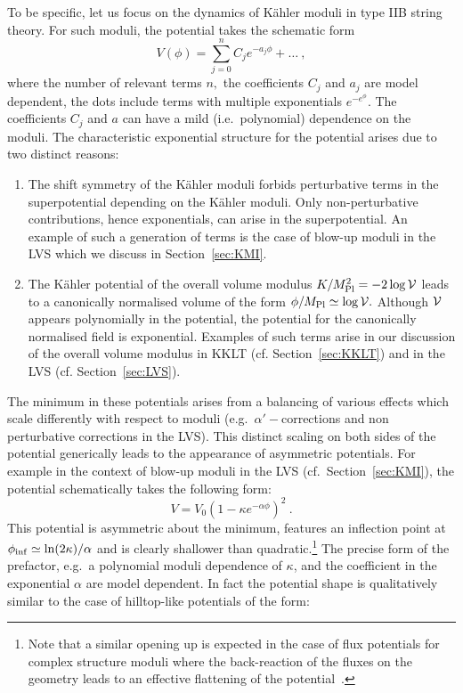 \documentclass[12pt]{article}
\begin{document}
To be specific, let us focus on the dynamics of K\"ahler moduli in type IIB string theory. For such moduli, the potential takes the schematic form
\begin{equation}
V(\phi)=\sum_{j=0}^n C_j e^{-a_j  \phi}+\ldots~,
\end{equation}
where the number of relevant terms $n,$ the coefficients $C_j$ and $a_j$ are model dependent,  the dots include terms with multiple exponentials $e^{-e^\phi}.$ The coefficients $C_j$ and $a$ can have a mild (i.e.~polynomial) dependence on the moduli. The characteristic exponential structure for the potential arises due to two distinct reasons:
\begin{enumerate}
\item The shift symmetry of the K\"ahler moduli forbids perturbative terms in the superpotential depending on the K\"ahler moduli. Only non-perturbative contributions, hence exponentials, can arise in the superpotential. An example of such a generation of terms is the case of blow-up moduli in the LVS which we discuss in Section~\ref{sec:KMI}.
\item The K\"ahler potential of the overall volume modulus $K/M^2_{\rm Pl}=-2\log{{\mathcal V}}$ leads to a canonically normalised volume of the form $\phi/M_{\rm Pl}\simeq \log{{\mathcal V}}.$ Although ${\cal V}$ appears polynomially in the potential, the potential for the canonically normalised field is exponential. Examples of such terms arise in our discussion of the overall volume modulus in KKLT (cf. Section~\ref{sec:KKLT}) and in the LVS (cf. Section~\ref{sec:LVS}).
\end{enumerate}
The minimum in these potentials arises from a balancing of various effects which scale differently with respect to moduli (e.g.~$\alpha'-$corrections and non perturbative corrections in the LVS). This distinct scaling on both sides of the potential generically leads to the appearance of asymmetric potentials. For example in the context of blow-up moduli in the LVS (cf.~Section~\ref{sec:KMI}), the potential schematically takes the following form:
\begin{equation}
V=V_0(1-\kappa e^{-\alpha\phi})^2~.
\label{eq:pkm}
\end{equation}
This potential is asymmetric about the minimum, features an inflection point at $\phi_{\rm inf}\simeq\ln(2\kappa)/\alpha$ and is clearly shallower than quadratic.\footnote{Note that a similar opening up is expected in the case of flux potentials for complex structure moduli where the back-reaction of the fluxes on the geometry leads to an effective flattening of the potential~\cite{Landete:2017amp}.} The precise form of the prefactor, e.g.~a polynomial moduli dependence of $\kappa$, and the coefficient in the exponential $\alpha$ are model dependent. In fact the potential shape is qualitatively similar to the case of hilltop-like potentials of the form:
\end{document}

